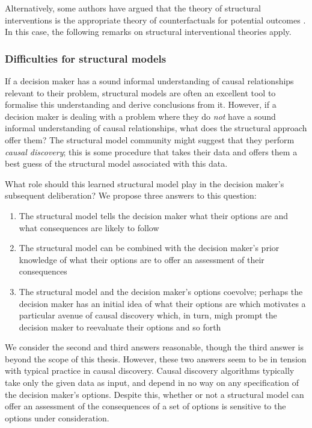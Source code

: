 Alternatively, some authors have argued that the theory of structural interventions is the appropriate theory of counterfactuals for potential outcomes \citep[chap. ~7]{pearl_causality:_2009}. In this case, the following remarks on structural interventional theories apply.

\subsubsection{Difficulties for structural models}

If a decision maker has a sound informal understanding of causal relationships relevant to their problem, structural models are often an excellent tool to formalise this understanding and derive conclusions from it. However, if a decision maker is dealing with a problem where they do \emph{not} have a sound informal understanding of causal relationships, what does the structural approach offer them? The structural model community might suggest that they perform \emph{causal discovery}; this is some procedure that takes their data and offers them a best guess of the structural model associated with this data.

What role should this learned structural model play in the decision maker's subsequent deliberation? We propose three answers to this question:
\begin{enumerate}
    \item The structural model tells the decision maker what their options are and what consequences are likely to follow
    \item The structural model can be combined with the decision maker's prior knowledge of what their options are to offer an assessment of their consequences
    \item The structural model and the decision maker's options coevolve; perhaps the decision maker has an initial idea of what their options are which motivates a particular avenue of causal discovery which, in turn, migh prompt the decision maker to reevaluate their options and so forth
\end{enumerate}

We consider the second and third answers reasonable, though the third answer is beyond the scope of this thesis. However, these two answers seem to be in tension with typical practice in causal discovery. Causal discovery algorithms typically take only the given data as input, and depend in no way on any specification of the decision maker's options. Despite this, whether or not a structural model can offer an assessment of the consequences of a set of options is sensitive to the options under consideration.

